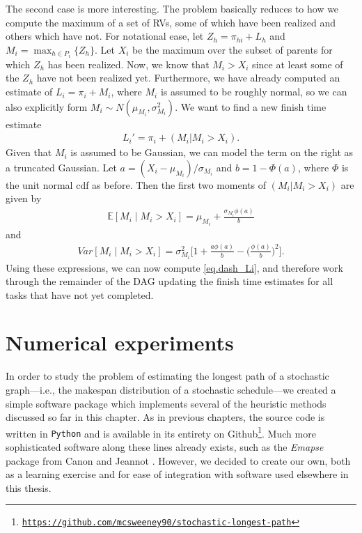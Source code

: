 \documentclass[12pt]{article}
\def\E{\mathbb{E}}
\begin{document}
The second case is more interesting. The problem basically reduces to how we compute the maximum of a set of RVs, some of which have been realized and others which have not. For notational ease, let $Z_h = \pi_{hi} + L_h$ and $M_i = \max_{h \in P_i} \{ Z_h  \}$.  Let $X_i$ be the maximum over the subset of parents for which $Z_h$ has been realized. Now, we know that $M_i > X_i$ since at least some of the $Z_h$ have not been realized yet. Furthermore, we have already computed an estimate of $L_i = \pi_i + M_i$, where $M_i$ is assumed to be roughly normal, so we can also explicitly form $M_i \sim N(\mu_{M_i}, \sigma_{M_i}^2)$. We want to find a new finish time estimate
\begin{align}
  \label{eq.dash_Li}
  L_i' = \pi_i + (M_i | M_i > X_i). 
\end{align}
Given that $M_i$ is assumed to be Gaussian, we can model the term on the right as a truncated Gaussian. Let $a = (X_i - \mu_{M_i}) / \sigma_{M_i}$ and $b = 1 - \Phi(a)$, where $\Phi$ is the unit normal cdf as before. Then the first two moments of $(M_i | M_i > X_i)$ are given by
\begin{align*}
  \E[M_i \mid M_i > X_i] = \mu_{M_i} + \frac{\sigma_{M_i}\phi(a)}{b}
\end{align*}
and
\begin{align*}
  Var[M_i \mid M_i > X_i] = \sigma_{M_i}^2 \bigg[ 1 + \frac{a\phi(a)}{b} - \bigg( \frac{\phi(a)}{b} \bigg)^2    \bigg].
\end{align*}
Using these expressions, we can now compute \eqref{eq.dash_Li}, and therefore work through the remainder of the DAG updating the finish time estimates for all tasks that have not yet completed. 

\section{Numerical experiments}
\label{sect.results}

In order to study the problem of estimating the longest path of a stochastic graph---i.e., the makespan distribution of a stochastic schedule---we created a simple software package which implements several of the heuristic methods discussed so far in this chapter. As in previous chapters, the source code is written in {\tt Python} and is available in its entirety on Github\footnote{\href{https://github.com/mcsweeney90/stochastic-longest-path}{{\tt \small https://github.com/mcsweeney90/stochastic-longest-path}}}. Much more sophisticated software along these lines already exists, such as the {\em Emapse} package from Canon and Jeannot \cite{can16}. However, we decided to create our own, both as a learning exercise and for ease of integration with software used elsewhere in this thesis. 
\end{document}
